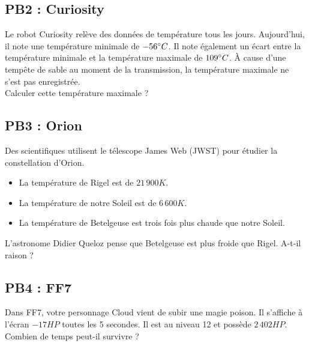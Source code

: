 \vspace{1cm}
\subsection*{PB2 : Curiosity} 
  

Le robot Curiosity relève des données de température tous les jours. Aujourd'hui, il note une température minimale de $-56 \degree C$. Il note également un écart entre la température minimale et la température maximale de $ 109\degree C$. \newline
À cause d'une tempête de sable au moment de la transmission, la température maximale ne s'est pas enregistrée. \\

Calculer cette température maximale ?

\vspace{1cm}
\subsection*{PB3 : Orion}  

Des scientifiques utilisent le télescope James Web (JWST) pour étudier la constellation d'Orion. \\

\begin{itemize}
  \item La température de Rigel est de $21\,900K$.
  \item La température de notre Soleil est de $6\,600K$.
  \item La température de Betelgeuse est trois fois plus chaude que notre Soleil.
\end{itemize}

L'astronome Didier Queloz pense que Betelgeuse est plus froide que Rigel. A-t-il raison ? 

\vspace{1cm}
\subsection*{PB4 : FF7} 

Dans FF7, votre personnage Cloud vient de subir une magie poison. Il s'affiche à l'écran $-17HP$ toutes les 5 secondes. Il est au niveau 12 et possède $2\,402HP$. \\
  
Combien de temps peut-il survivre ?



